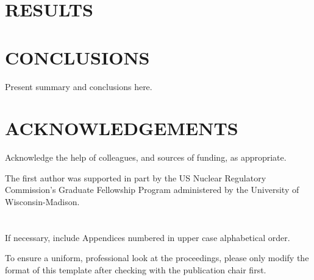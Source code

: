 \documentclass[letterpaper]{physor2024}
\begin{document}
\section{RESULTS}


\section{CONCLUSIONS}
Present summary and conclusions here.

\section*{ACKNOWLEDGEMENTS}
Acknowledge the help of colleagues, and sources of funding, as appropriate.

The first author was supported in part by the US Nuclear Regulatory Commission's Graduate Fellowship Program administered by the University of Wisconsin-Madison.





\appendix

\section{}
If necessary, include Appendices numbered in upper case alphabetical order.

To ensure a uniform, professional look at the proceedings, please only modify the format of this template after checking with the publication chair first.
\end{document}
